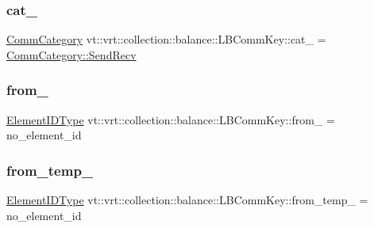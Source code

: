 \subsubsection{\texorpdfstring{cat\+\_\+}{cat\_}}
{\footnotesize\ttfamily \hyperlink{namespacevt_1_1vrt_1_1collection_1_1balance_a9cc6c6884ca0416dae824e9204093c57}{Comm\+Category} vt\+::vrt\+::collection\+::balance\+::\+L\+B\+Comm\+Key\+::cat\+\_\+ = \hyperlink{namespacevt_1_1vrt_1_1collection_1_1balance_a9cc6c6884ca0416dae824e9204093c57a95aeb71ffd419cc14c6929f9dcd6cdff}{Comm\+Category\+::\+Send\+Recv}}

\mbox{\label{structvt_1_1vrt_1_1collection_1_1balance_1_1_l_b_comm_key_a9bf6895070fbbce25ac12307bf606036}} 
\subsubsection{\texorpdfstring{from\+\_\+}{from\_}}
{\footnotesize\ttfamily \hyperlink{namespacevt_1_1vrt_1_1collection_1_1balance_a14c8d2c972f2913aa3f1636e5be0a120}{Element\+I\+D\+Type} vt\+::vrt\+::collection\+::balance\+::\+L\+B\+Comm\+Key\+::from\+\_\+ = no\+\_\+element\+\_\+id}

\mbox{\label{structvt_1_1vrt_1_1collection_1_1balance_1_1_l_b_comm_key_add033f95cac2f80b6ccd8ae55e73dcfe}} 
\subsubsection{\texorpdfstring{from\+\_\+temp\+\_\+}{from\_temp\_}}
{\footnotesize\ttfamily \hyperlink{namespacevt_1_1vrt_1_1collection_1_1balance_a14c8d2c972f2913aa3f1636e5be0a120}{Element\+I\+D\+Type} vt\+::vrt\+::collection\+::balance\+::\+L\+B\+Comm\+Key\+::from\+\_\+temp\+\_\+ = no\+\_\+element\+\_\+id}

